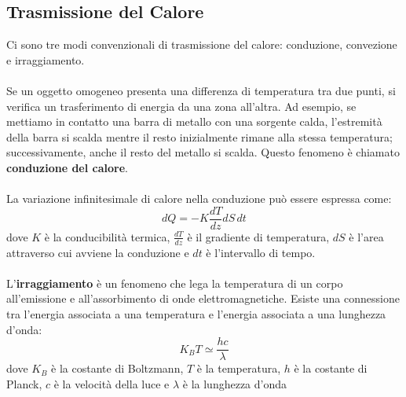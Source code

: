 \documentclass{article}
\begin{document}
\subsection{Trasmissione del Calore}
Ci sono tre modi convenzionali di trasmissione del calore: conduzione, convezione e irraggiamento.\\
\\
Se un oggetto omogeneo presenta una differenza di temperatura tra due punti, si verifica un trasferimento di energia da una zona all'altra. Ad esempio, se mettiamo in contatto una barra di metallo con una sorgente calda, l'estremità della barra si scalda mentre il resto inizialmente rimane alla stessa temperatura; successivamente, anche il resto del metallo si scalda. Questo fenomeno è chiamato \textbf{conduzione del calore}.\\
\\
La variazione infinitesimale di calore nella conduzione può essere espressa come:
\[
    dQ = -K\frac{dT}{dz}dS \, dt
\]
dove \( K \) è la conducibilità termica, \(\frac{dT}{dz}\) è il gradiente di temperatura, \( dS \) è l'area attraverso cui avviene la conduzione e \( dt \) è l'intervallo di tempo.\\
\\
L'\textbf{irraggiamento} è un fenomeno che lega la temperatura di un corpo all'emissione e all'assorbimento di onde elettromagnetiche. Esiste una connessione tra l'energia associata a una temperatura e l'energia associata a una lunghezza d'onda:
\[
    K_B T \simeq \frac{hc}{\lambda}
\]
dove \( K_B \) è la costante di Boltzmann, \( T \) è la temperatura, \( h \) è la costante di Planck, \( c \) è la velocità della luce e \( \lambda \) è la lunghezza d'onda
\end{document}
